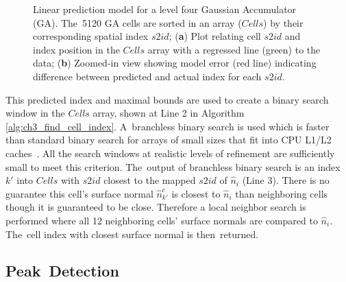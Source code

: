 \begin{figure}[H]
\begin{subfigure}[t]{.33\linewidth}
    \caption{\label{fig:ch3_linear_interp_2}}
  \end{subfigure}
  \caption{Linear prediction model for a level four Gaussian Accumulator (GA). The~5120 GA cells are sorted in an array ($Cells$) by their corresponding spatial index $s2id$;  (\textbf{a}) Plot relating cell $s2id$ and index position in the $Cells$ array with a regressed line (green) to the data; (\textbf{b})  Zoomed-in view showing model error (red line) indicating  difference between predicted and actual index for each $s2id$.  
  }\label{fig:ch3_linear_interp}
\end{figure}



This predicted index and maximal bounds are used to create a binary search window in the $Cells$ array, shown at Line 2 in Algorithm \ref{alg:ch3_find_cell_index}. A~branchless binary search is used which is faster than standard binary search for arrays of small sizes that fit into CPU L1/L2 caches~\cite{khuong_array_2017}. All the search windows at realistic levels of refinement are sufficiently small to meet this criterion. The~output of branchless binary search is an index $k'$ into $Cells$ with $s2id$ closest to the mapped $s2id$ of $\hat{n}_i$ (Line 3). There is no guarantee this cell's surface normal $\hat{n}^c_{k'}$ is closest to $\hat{n}_i$ than neighboring cells though it is guaranteed to be close. Therefore a local neighbor search is performed where all 12 neighboring cells' surface normals are compared to $\hat{n}_i$. The~cell index with closest surface normal is then~returned. 


\subsection{Peak~Detection}\label{sec:ch3_methods_fastga_peak}


